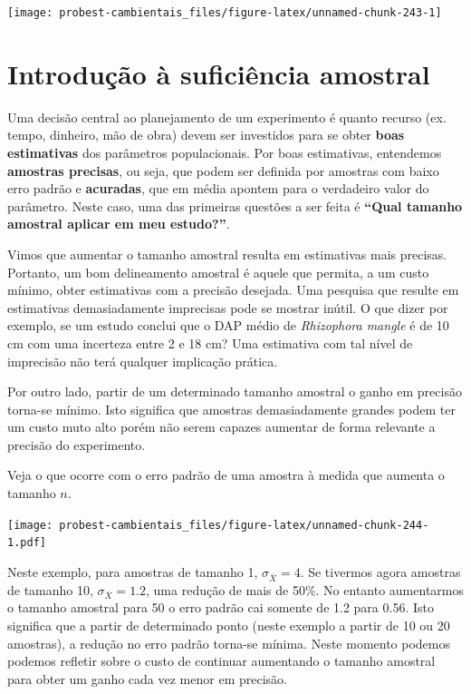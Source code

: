 \documentclass[
]{book}
\begin{document}
\begin{center}\texttt{[image: probest-cambientais\_files/figure-latex/unnamed-chunk-243-1]} \end{center}

\hypertarget{introduuxe7uxe3o-uxe0-suficiuxeancia-amostral}{%
\section{Introdução à suficiência amostral}\label{introduuxe7uxe3o-uxe0-suficiuxeancia-amostral}}

Uma decisão central ao planejamento de um experimento é quanto recurso (ex. tempo, dinheiro, mão de obra) devem ser investidos para se obter \textbf{boas estimativas} dos parâmetros populacionais. Por boas estimativas, entendemos \textbf{amostras precisas}, ou seja, que podem ser definida por amostras com baixo erro padrão e \textbf{acuradas}, que em média apontem para o verdadeiro valor do parâmetro. Neste caso, uma das primeiras questões a ser feita é \textbf{``Qual tamanho amostral aplicar em meu estudo?''}.

Vimos que aumentar o tamanho amostral resulta em estimativas mais precisas. Portanto, um bom delineamento amostral é aquele que permita, a um custo mínimo, obter estimativas com a precisão desejada. Uma pesquisa que resulte em estimativas demasiadamente imprecisas pode se mostrar inútil. O que dizer por exemplo, se um estudo conclui que o DAP médio de \emph{Rhizophora mangle} é de 10 cm com uma incerteza entre 2 e 18 cm? Uma estimativa com tal nível de imprecisão não terá qualquer implicação prática.

Por outro lado, partir de um determinado tamanho amostral o ganho em precisão torna-se mínimo. Isto significa que amostras demasiadamente grandes podem ter um custo muto alto porém não serem capazes aumentar de forma relevante a precisão do experimento.

Veja o que ocorre com o erro padrão de uma amostra à medida que aumenta o tamanho \(n\).

\texttt{[image: probest-cambientais\_files/figure-latex/unnamed-chunk-244-1.pdf]}

Neste exemplo, para amostras de tamanho 1, \(\sigma_{\overline{X}} = 4\). Se tivermos agora amostras de tamanho 10, \(\sigma_{\overline{X}} = 1.2\), uma redução de mais de 50\%. No entanto aumentarmos o tamanho amostral para 50 o erro padrão cai somente de 1.2 para 0.56. Isto significa que a partir de determinado ponto (neste exemplo a partir de 10 ou 20 amostras), a redução no erro padrão torna-se mínima. Neste momento podemos podemos refletir sobre o custo de continuar aumentando o tamanho amostral para obter um ganho cada vez menor em precisão.
\end{document}
